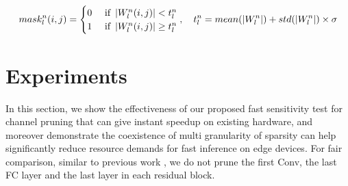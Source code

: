 \documentclass{article}
\begin{document}
\begin{equation}
\vspace{-2mm}
mask_{l}^{n}(i,j) = \begin{cases}
0 & \text{ if } \left | W_{l}^{n}(i,j) \right|   <   t_{l}^{n} \\ 
1 & \text{ if } \left | W_{l}^{n}(i,j) \right|  \geq  t_{l}^{n}
\end{cases}
\label{eq:mask}
, \quad  t_{l}^{n} = mean(|W_{l}^{n}|) + std(|W_{l}^{n}|)\times \sigma
\vspace{-2mm}
\end{equation}




\section{Experiments}

In this section, we show the effectiveness of our proposed fast sensitivity test for channel pruning that can give instant speedup on existing hardware, and moreover demonstrate the coexistence of multi granularity of sparsity can help significantly reduce resource demands for fast inference on edge devices. %
For fair comparison, similar to previous work \cite{Li2016PruningFF}\cite{luo2017thinet}, we do not prune the first Conv, the last FC layer and the last layer in each residual block. 
\end{document}
